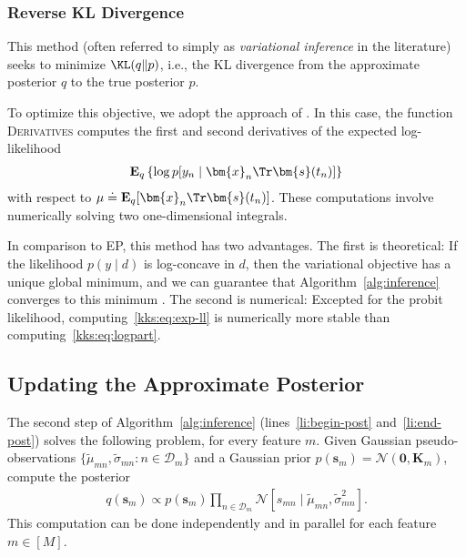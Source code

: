 \subsubsection{Reverse KL Divergence}

This method (often referred to simply as \emph{variational inference} in the literature) seeks to minimize $\KL(q \Vert p)$, i.e., the KL divergence from the approximate posterior $q$ to the true posterior $p$.

To optimize this objective, we adopt the approach of \citet{khan2017conjugate}.
In this case, the function \textsc{Derivatives} computes the first and second derivatives of the expected log-likelihood
\begin{align}
\label{kks:eq:exp-ll}
\mathbf{E}_q \left\{ \log p[y_n \mid \bm{x}_n\Tr \bm{s}(t_n)] \right\}
\end{align}
with respect to $\mu \doteq \mathbf{E}_q[\bm{x}_n\Tr \bm{s}(t_n)]$.
These computations involve numerically solving two one-dimensional integrals.

In comparison to EP, this method has two advantages.
The first is theoretical:
If the likelihood $p(y \mid d)$ is log-concave in $d$, then the variational objective has a unique global minimum, and we can guarantee that Algorithm~\ref{alg:inference} converges to this minimum \citep{khan2017conjugate}.
The second is numerical:
Excepted for the probit likelihood, computing~\eqref{kks:eq:exp-ll} is numerically more stable than computing~\eqref{kks:eq:logpart}.


\subsection{Updating the Approximate Posterior}
\label{kks:sec:inf-posterior}

The second step of Algorithm~\ref{alg:inference} (lines~\ref{li:begin-post} and~\ref{li:end-post}) solves the following problem, for every feature $m$.
Given Gaussian pseudo-observations $\{ \tilde{\mu}_{mn}, \tilde{\sigma}_{mn} : n \in \mathcal{D}_m \}$ and a Gaussian prior $p(\bm{s}_m) = \mathcal{N}(\bm{0}, \bm{K}_m)$, compute the posterior
\begin{align*}
q(\bm{s}_m) \propto p(\bm{s}_m) \prod_{n \in \mathcal{D}_m} \mathcal{N}[s_{mn} \mid \tilde{\mu}_{mn}, \tilde{\sigma}^2_{mn}].
\end{align*}
This computation can be done independently and in parallel for each feature $m \in [M]$.


